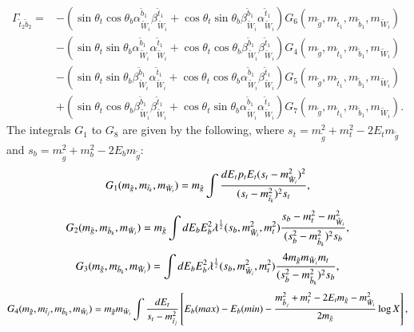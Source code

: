 \documentclass[final,3p,times]{elsarticle}
\begin{document}
\begin{equation}
\begin{aligned}
\Gamma_{\tilde{t}_2 \tilde{b}_2} = & -(\sin\theta_t \cos\theta_b \alpha_{\tilde{W}_i}^{\tilde{b}_1} \beta_{\tilde{W}_i}^{\tilde{t}_1} + \cos\theta_t \sin\theta_b \beta_{\tilde{W}_i}^{\tilde{b}_1} \alpha_{\tilde{W}_i}^{\tilde{t}_1})G_{6}(m_{\tilde{g}},m_{\tilde{t}_1},m_{\tilde{b}_1},m_{\tilde{W}_i}) \\ & - (\sin\theta_t \sin\theta_b \alpha_{\tilde{W}_i}^{\tilde{b}_1}\alpha_{\tilde{W}_i}^{\tilde{t}_1} + \cos\theta_t \cos\theta_b \beta_{\tilde{W}_i}^{\tilde{b}_1}\beta_{\tilde{W}_i}^{\tilde{t}_1}) G_{4}(m_{\tilde{g}},m_{\tilde{t}_1}, m_{\tilde{b}_1},m_{\tilde{W}_i}) \\ & - (\sin\theta_t \sin\theta_b \beta_{\tilde{W}_i}^{\tilde{b}_1} \alpha_{\tilde{W}_i}^{\tilde{t}_1} + \cos\theta_t \cos\theta_b \alpha_{\tilde{W}_i}^{\tilde{b}_1} \beta_{\tilde{W}_i}^{\tilde{t}_1})G_{5}(m_{\tilde{g}},m_{\tilde{t}_1}, m_{\tilde{b}_1}, m_{\tilde{W}_i}) \\ & + (\sin\theta_t\cos\theta_b \beta_{\tilde{W}_i}^{\tilde{b}_1} \beta_{\tilde{W}_i}^{\tilde{t}_1} + \cos\theta_t \sin\theta_b \alpha_{\tilde{W}_i}^{\tilde{b}_1} \alpha_{\tilde{W}_i}^{\tilde{t}_1})G_{7}(m_{\tilde{g}},m_{\tilde{t}_1},m_{\tilde{b}_1},m_{\tilde{W}_i}).
\end{aligned}
\end{equation}
The integrals $G_1$ to $G_8$ are given by the following, where $s_{t} = m_{\tilde{g}}^2 + m_{t}^2 -2 E_{t} m_{\tilde{g}}$ and $s_{b} = m_{\tilde{g}}^2 + m_{b}^2 -2 E_{b} m_{\tilde{g}}$:
\begin{equation}
G_{1}(m_{\tilde{g}},m_{\tilde{t}_k},m_{\tilde{W}_i}) = m_{\tilde{g}} \int {d E_{t} p_{t} E_{t} (s_{t} - m_{\tilde{W}_i}^2)^2 \over (s_{t} - m_{\tilde{t}_k}^2)^2 s_{t}},
\end{equation}
\begin{equation}
G_{2}(m_{\tilde{g}},m_{\tilde{b}_k},m_{\tilde{W}_i}) = m_{\tilde{g}} \int d E_{b} E_{b}^2 \lambda^{1 \over 2} (s_{b},m_{\tilde{W}_i}^2,m_{t}^2) {s_{b} - m_{t}^2 - m_{\tilde{W}_i}^2 \over (s_{b}^2 - m_{\tilde{b}_k}^2)^2 s_b},
\end{equation}
\begin{equation}
G_{3}(m_{\tilde{g}},m_{\tilde{b}_k},m_{\tilde{W}_i}) = \int d E_{b} E_{b}^2 \lambda^{1 \over 2} (s_{b},m_{\tilde{W}_i}^2,m_{t}^2) {4 m_{\tilde{g}} m_{\tilde{W}_i} m_{t} \over (s_{b}^2 - m_{\tilde{b}_k}^2)^2 s_b},
\end{equation}
\begin{equation}
G_{4}(m_{\tilde{g}},m_{\tilde{t}_j},m_{\tilde{b}_k},m_{\tilde{W}_i}) = m_{\tilde{g}} m_{\tilde{W}_i} \int {d E_{t} \over s_{t} - m_{\tilde{t}_j}^2} \left[ E_{b}(max) - E_{b}(min) - {m_{\tilde{b}_j}^2 + m_{t}^2 - 2 E_{t} m_{\tilde{g}} - m_{\tilde{W}_i}^2 \over 2 m_{\tilde{g}}} \log X\right] ,
\end{equation}
\end{document}
